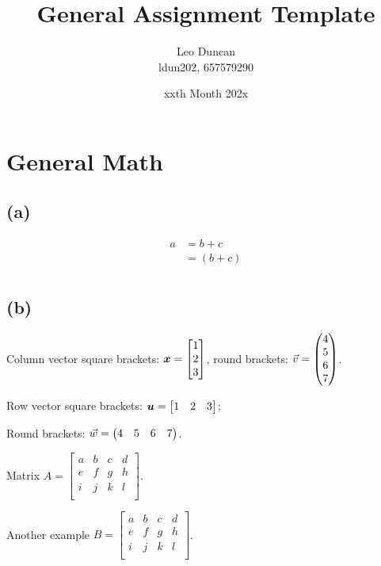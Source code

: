 \documentclass[11pt, a4paper]{article}
\title{General Assignment Template}
\author{Leo Duncan \\ ldun202, 657579290}
\date{xxth Month 202x}
\begin{document}
\maketitle

\section{General Math}

\subsection{(a)} %

\begin{equation*}
    \begin{split}
        a &= b + c \\
        &= (b + c) \\
    \end{split}
\end{equation*}

\subsection{(b)} %

Column vector square brackets: $\bm{x} = \begin{bmatrix}1\\2\\3\end{bmatrix}$, round brackets: $\vec{v} = \begin{pmatrix}4\\5\\6\\7\end{pmatrix}$.

Row vector square brackets: $\bm{u} = \begin{bmatrix}1&2&3\end{bmatrix}$;

Round brackets: $\vec{w} = \begin{pmatrix}4&5&6&7\end{pmatrix}$.

Matrix $A = \left[\begin{array}{cccc}
    a & b & c & d \\
    e & f & g & h \\
    i & j & k & l \\
\end{array}\right]$.

Another example $B = \left[\begin{array}{ccc|c}
    a & b & c & d \\
    e & f & g & h \\
    i & j & k & l \\
\end{array}\right]$.
\end{document}
